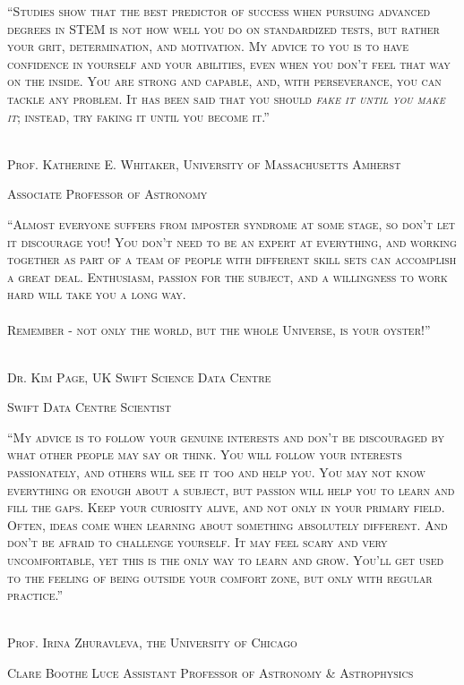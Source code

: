 \documentclass[12pt]{article}
\begin{document}


\pagebreak
\strut \vspace{175pt}

\noindent \textsc{``Studies show that the best predictor of success when pursuing advanced degrees in STEM is not how well you do on standardized tests, but rather your grit, determination, and motivation.  My advice to you is to have confidence in yourself and your abilities, even when you don’t feel that way on the inside. You are strong and capable, and, with perseverance, you can tackle any problem. It has been said that you should \textsl{fake it until you make it}; instead, try faking it until you become it.''}
\\
\\
\strut\hfill \textemdash \textsc{Prof. Katherine E. Whitaker, University of Massachusetts Amherst}\\
\strut \hfill \footnotesize{\textsc{Associate Professor of Astronomy}}
\normalsize



\pagebreak
\strut\vspace{175pt}

\noindent \textsc{``Almost everyone suffers from imposter syndrome at some stage, so don't let it discourage you! You don't need to be an expert at everything, and working together as part of a team of people with different skill sets can accomplish a great deal. Enthusiasm, passion for the subject, and a willingness to work hard will take you a long way.\\
\\
Remember - not only the world, but the whole Universe, is your oyster!''}\\
\\
\strut\hfill \textemdash \textsc{Dr. Kim Page, UK Swift Science Data Centre}\\
\strut \hfill \footnotesize{\textsc{Swift Data Centre Scientist}}
\normalsize



\pagebreak
\strut\vspace{150pt}

\noindent \textsc{``My advice is to follow your genuine interests and don’t be discouraged by what other people may say or think. You will follow your interests passionately, and others will see it too and help you. You may not know everything or enough about a subject, but passion will help you to learn and fill the gaps. Keep your curiosity alive, and not only in your primary field. Often, ideas come when learning about something absolutely different. And don’t be afraid to challenge yourself. It may feel scary and very uncomfortable, yet this is the only way to learn and grow. You’ll get used to the feeling of being outside your comfort zone, but only with regular practice.''}\\
\\
\strut\hfill \textemdash \textsc{Prof. Irina Zhuravleva, the University of Chicago}\\
\strut \hfill \footnotesize{\textsc{Clare Boothe Luce Assistant Professor of Astronomy \& Astrophysics}}
\normalsize
\end{document}
